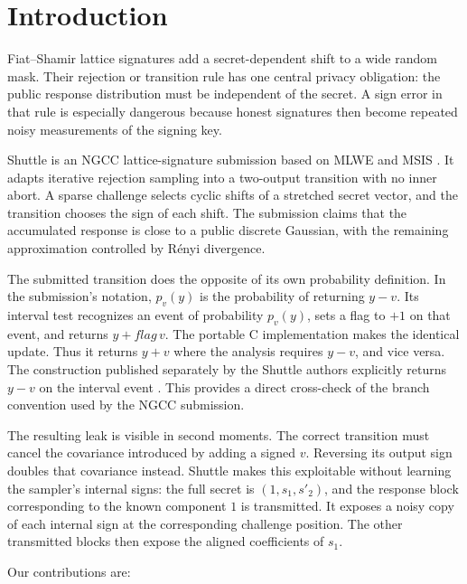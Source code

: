 \documentclass[11pt,a4paper]{article}
\begin{document}
\section{Introduction}

Fiat--Shamir lattice signatures add a secret-dependent shift to a wide random
mask.  Their rejection or transition rule has one central privacy obligation:
the public response distribution must be independent of the secret.  A sign
error in that rule is especially dangerous because honest signatures then
become repeated noisy measurements of the signing key.

Shuttle is an NGCC lattice-signature submission based on MLWE and MSIS
\cite{Shuttle}.  It adapts iterative rejection sampling \cite{Gaertner} into a
two-output transition with no inner abort.  A sparse challenge selects cyclic
shifts of a stretched secret vector, and the transition chooses the sign of
each shift.  The submission claims that the accumulated response is close to
a public discrete Gaussian, with the remaining approximation controlled by
R\'enyi divergence.

The submitted transition does the opposite of its own probability
definition.  In the submission's notation, $p_v(y)$ is the probability of
returning $y-v$.  Its interval test recognizes an event of probability
$p_v(y)$, sets a flag to $+1$ on that event, and returns $y+\mathit{flag}\,v$.
The portable C implementation makes the identical update.  Thus it returns
$y+v$ where the analysis requires $y-v$, and vice versa.  The construction published separately by the Shuttle authors explicitly
returns $y-v$ on the interval event \cite{MingEtAl}.  This provides a direct
cross-check of the branch convention used by the NGCC submission.

The resulting leak is visible in second moments.  The correct transition must
cancel the covariance introduced by adding a signed $v$.  Reversing its
output sign doubles that covariance instead.  Shuttle makes this exploitable
without learning the sampler's internal signs: the full secret is
$(1,s_1,s'_2)$, and the response block corresponding to the known component
$1$ is transmitted.  It exposes a noisy copy of each internal sign at the
corresponding challenge position.  The other transmitted blocks then expose
the aligned coefficients of $s_1$.

Our contributions are:
\end{document}
